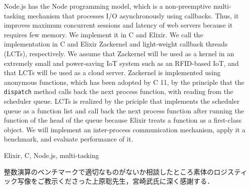 \documentclass[submit,techrep]{ipsj}
\newcommand{\Rplus}{\protect\hspace{-.1em}\protect\raisebox{.8ex}{\smaller{\smaller\smaller\textbf{+}}}}
\newcommand{\Cpp}{\mbox{C\Rplus\Rplus}\xspace}
\begin{document}
\begin{eabstract}
Node.js has the Node programming model, which is a non-preemptive multi-tasking mechanism that processes I/O asynchronously using callbacks. Thus, it improves maximum concurrent sessions and latency of web servers because it requires few memory. We implement it in \Cpp and Elixir. We call the implementation in \Cpp and Elixir Zackernel and light-weight callback threads (LCTs), respectively. We assume that Zackernel will be used as a kernel in an extremely small and power-saving IoT system such as an RFID-based IoT, and that LCTs will be used as a cloud server. Zackernel is implemented using anonymous functions, which has been adopted by \Cpp 11, by the principle that the {\tt dispatch} method calls back the next process function, with reading from the scheduler queue. LCTs is realized by the priciple that implements the scheduler queue as a function list and call back the next process function after running the function of the head of the queue because Elixir treats a function as a first-class object. We will implement an inter-process communication mechanism, apply it a benchmark, and evaluate performance of it.
\end{eabstract}

\begin{ekeyword}
Elixir,  \Cpp , Node.js, multi-tasking
\end{ekeyword}

\maketitle



\begin{acknowledgment}
整数演算のベンチマークで適切なものがないか相談したところ素体のロジスティック写像\cite{Miyazaki14}をご教示くださった上原聡先生，宮崎武氏に深く感謝する．
\end{acknowledgment}




\end{document}
